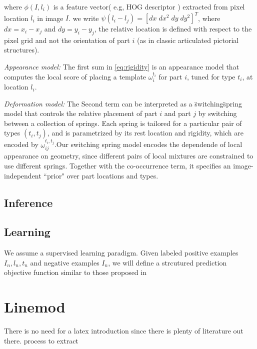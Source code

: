 where $\phi(I,l_i)$ is a feature vector( e.g, HOG descriptor \citet{Dalal2005})
extracted from pixel location $l_i$ in image $I$. we write $\psi(l_i - l_j)=[dx\; dx^2\; dy\; dy^2]^T$, where $dx=x_i - x_j$ and $dy=y_i - y_j$, the relative location is defined
with respect to the pixel grid and not the orientation of part $i$ (as in classic 
articulated pictorial structures).

\textit{Appearance model:} The first sum in \ref{eq:rigidity} is an appearance model that computes the local score of placing a template $\omega_i^{t_i}$ for part $i$,
tuned for type $t_i$, at location $l_i$.

\textit{Deformation model:} The Second term can be interpreted as a \"switching\"
spring model that controls the relative placement of part $i$ and part $j$ by switching
 between a collection of springs. Each spring is tailored for a particular pair of 
 types $(t_i,t_j)$, and is parametrized by its rest location and rigidity, which are 
 encoded by $\omega_{ij}^{t_i, t_j}$.Our switching spring model encodes the dependende
 of local appearance on geometry, since different pairs of local mixtures are constrained
 to use different springs. Together with the co-occurrence term, it specifies an
 image-independent ``prior" over part locations and types.

 \subsection{Inference}




 \subsection{Learning}
 We assume a supervised learning paradigm. Given labeled positive examples ${I_n, l_n,t_n}$ 
and negative examples ${I_n}$, we will define a strcutured prediction objective function similar to those proposed in 



\section{Linemod}
There is no need for a latex introduction since there is plenty of literature out there.
process to extract
